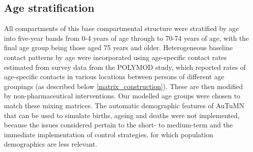 \subsection{Age stratification}
All compartments of this base compartmental structure were stratified by age into five-year bands from 0-4 years of age through to 70-74 years of age, with the final age group being those aged 75 years and older. Heterogeneous baseline contact patterns by age were incorporated using age-specific contact rates estimated from survey data from the POLYMOD study, which reported rates of age-specific contacts in various locations between persons of different age groupings (as described below \ref{matrix_construction}). These are then modified by non-pharmaceutical interventions. Our modelled age groups were chosen to match these mixing matrices. The automatic demographic features of AuTuMN that can be used to simulate births, ageing and deaths were not implemented, because the issues considered pertain to the short- to medium-term and the immediate implementation of control strategies, for which population demographics are less relevant.
